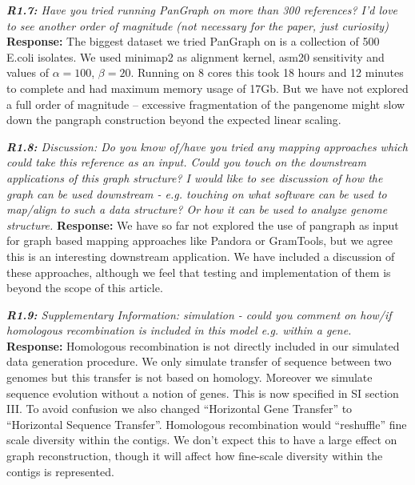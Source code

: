 \documentclass[aps,rmp,onecolumn]{revtex4-1}
\newcommand{\reviewer}[2]{{\it \textbf{#1:} #2\vskip 5mm}}
\newcommand{\response}[1]{{{\color{response}\textbf{Response:} #1}}\vskip 5mm}
\newcommand{\SIsynthdata}{III}
\begin{document}
\reviewer{R1.7}{Have you tried running PanGraph on more than 300 references? I'd love to see another order of magnitude (not necessary for the paper, just curiosity)}
\response{The biggest dataset we tried PanGraph on is a collection of 500 E.coli isolates. We used minimap2 as alignment kernel, asm20 sensitivity and values of $\alpha = 100$, $\beta=20$. Running on 8 cores this took 18 hours and 12 minutes to complete and had maximum memory usage of 17Gb. But we have not explored a full order of  magnitude -- excessive fragmentation of the pangenome might slow down the pangraph construction beyond the expected linear scaling.
}

\reviewer{R1.8}{Discussion: Do you know of/have you tried any mapping approaches which could take this reference as an input. Could you touch on the downstream applications of this graph structure? I would like to see discussion of how the graph can be used downstream - e.g. touching on what software can be used to map/align to such a data structure? Or how it can be used to analyze genome structure.}
\response{We have so far not explored the use of pangraph as input for graph based mapping approaches like Pandora or GramTools, but we agree this is an interesting downstream application. We have included a discussion of these approaches, although we feel that testing and implementation of them is beyond the scope of this article.}

\reviewer{R1.9}{Supplementary Information: simulation - could you comment on how/if homologous recombination is included in this model e.g. within a gene.}
\response{Homologous recombination is not directly included in our simulated data generation procedure. We only simulate transfer of sequence between two genomes but this transfer is not based on homology. Moreover we simulate sequence evolution without a notion of genes. This is now specified in SI section \SIsynthdata. To avoid confusion we also changed ``Horizontal Gene Transfer'' to ``Horizontal Sequence Transfer''. Homologous recombination would  ``reshuffle'' fine scale diversity within the contigs. We don't expect this to have a large effect on graph reconstruction, though it will affect how fine-scale diversity within the contigs is represented. }
\end{document}
